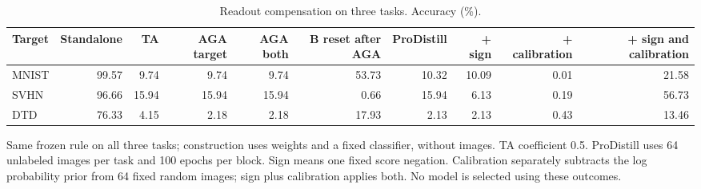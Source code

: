 \begin{table}[t]
\centering\scriptsize
\setlength{\tabcolsep}{3pt}
\caption{Readout compensation on three tasks. Accuracy (\%).}
\label{tab:centered_readout}
\begin{tabular}{@{}lrrrrrrrrr@{}}
\toprule
Target & Standalone & TA & AGA target & AGA both & B reset after AGA & ProDistill & + sign & + calibration & + sign and calibration \\
\midrule
MNIST & 99.57 & 9.74 & 9.74 & 9.74 & 53.73 & 10.32 & 10.09 & 0.01 & 21.58 \\
SVHN & 96.66 & 15.94 & 15.94 & 15.94 & 0.66 & 15.94 & 6.13 & 0.19 & 56.73 \\
DTD & 76.33 & 4.15 & 2.18 & 2.18 & 17.93 & 2.13 & 2.13 & 0.43 & 13.46 \\
\bottomrule
\end{tabular}
\par\smallskip
\begin{minipage}{\textwidth}\footnotesize Same frozen rule on all three tasks; construction uses weights and a fixed classifier, without images. TA coefficient 0.5. ProDistill uses 64 unlabeled images per task and 100 epochs per block. Sign means one fixed score negation. Calibration separately subtracts the log probability prior from 64 fixed random images; sign plus calibration applies both. No model is selected using these outcomes.\end{minipage}
\end{table}
